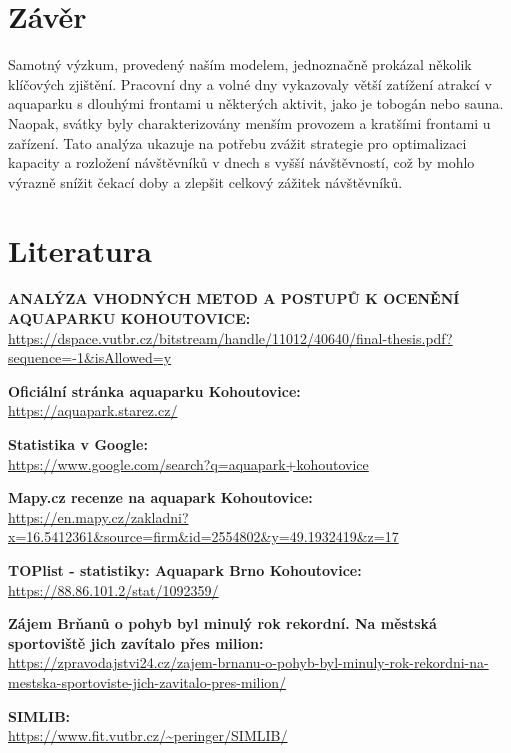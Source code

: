 \documentclass[a4paper, 11pt]{article}
\begin{document}
    \section{Závěr}
    Samotný výzkum, provedený naším modelem, jednoznačně prokázal několik klíčových zjištění. Pracovní dny a volné dny vykazovaly větší zatížení atrakcí v aquaparku s dlouhými frontami u některých aktivit, jako je tobogán nebo sauna. Naopak, svátky byly charakterizovány menším provozem a kratšími frontami u zařízení. Tato analýza ukazuje na potřebu zvážit strategie pro optimalizaci kapacity a rozložení návštěvníků v dnech s vyšší návštěvností, což by mohlo výrazně snížit čekací doby a zlepšit celkový zážitek návštěvníků.

    \section{Literatura}
    \begin{enumerate}[label={[\arabic*]}] 
    \item \textbf{ANALÝZA VHODNÝCH METOD A POSTUPŮ K OCENĚNÍ AQUAPARKU KOHOUTOVICE:} \\
    \url{https://dspace.vutbr.cz/bitstream/handle/11012/40640/final-thesis.pdf?sequence=-1&isAllowed=y} \label{itm:analyza}

    \item \textbf{Oficiální stránka aquaparku Kohoutovice:} \\
    \url{https://aquapark.starez.cz/}  \label{itm:off_stranka}

    \item \textbf{Statistika v Google:} \\
    \url{https://www.google.com/search?q=aquapark+kohoutovice} \label{itm:google_stat}

    \item \textbf{Mapy.cz recenze na aquapark Kohoutovice:} \\
    \url{https://en.mapy.cz/zakladni?x=16.5412361&source=firm&id=2554802&y=49.1932419&z=17} \label{itm:recenze}

    \item \textbf{TOPlist - statistiky: Aquapark Brno Kohoutovice:} \\
    \url{https://88.86.101.2/stat/1092359/} \label{itm:top-list}

    \item \textbf{Zájem Brňanů o pohyb byl minulý rok rekordní. Na městská sportoviště jich zavítalo přes milion:} \\
    \url{https://zpravodajstvi24.cz/zajem-brnanu-o-pohyb-byl-minuly-rok-rekordni-na-mestska-sportoviste-jich-zavitalo-pres-milion/} \label{itm:clanek}

    \item \textbf{SIMLIB:} \\
    \url{https://www.fit.vutbr.cz/~peringer/SIMLIB/} \label{itm:simlib}
    
    \end{enumerate} 
    
\end{document}
